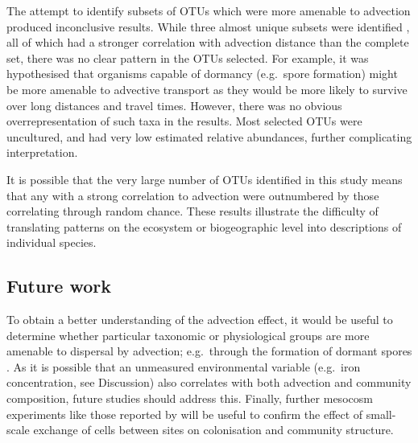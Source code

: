 The attempt to identify subsets of \acp{OTU} which were more amenable to advection produced inconclusive results.
While three almost unique subsets were identified , all of which had a stronger correlation with advection distance than the complete set, there was no clear pattern in the \acp{OTU} selected.
For example, it was hypothesised that organisms capable of dormancy (e.g.\ spore formation) might be more amenable to advective transport as they would be more likely to survive over long distances and travel times.
However, there was no obvious overrepresentation of such taxa in the results.
Most selected \acp{OTU} were uncultured, and had very low estimated relative abundances, further complicating interpretation.

It is possible that the very large number of \acp{OTU} identified in this study means that any with a strong correlation to advection were outnumbered by those correlating through random chance.
These results illustrate the difficulty of translating patterns on the ecosystem or biogeographic level into descriptions of individual species.

\subsection{Future work}

To obtain a better understanding of the advection effect, it would be useful to determine whether particular taxonomic or physiological groups are more amenable to dispersal by advection; e.g.\ through the formation of dormant spores \cite{Sul:2013in, Bissett:2010wj}.
As it is possible that an unmeasured environmental variable (e.g.\ iron concentration, see Discussion) also correlates with both advection and community composition, future studies should address this.
Finally, further mesocosm experiments like those reported by \citet{Declerck:2013cz} will be useful to confirm the effect of small-scale exchange of cells between sites on colonisation and community structure.
